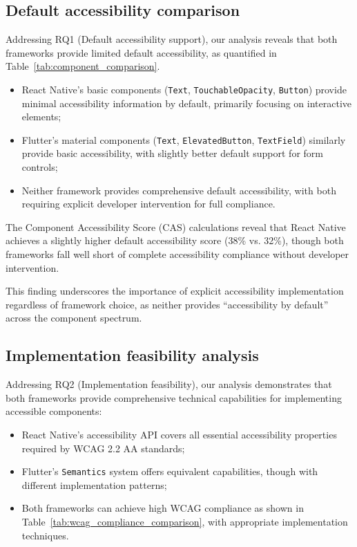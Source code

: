 \subsection{Default accessibility comparison}
\label{subsec:default-accessibility}

Addressing RQ1 (Default accessibility support), our analysis reveals that both frameworks provide limited default accessibility, as quantified in Table~\ref{tab:component_comparison}.

\begin{itemize}
    \item React Native's basic components (\texttt{Text}, \texttt{TouchableOpacity}, \texttt{Button}) provide minimal accessibility information by default, primarily focusing on interactive elements;
    
    \item Flutter's material components (\texttt{Text}, \texttt{ElevatedButton}, \texttt{TextField}) similarly provide basic accessibility, with slightly better default support for form controls;
    
    \item Neither framework provides comprehensive default accessibility, with both requiring explicit developer intervention for full compliance.
\end{itemize}

The Component Accessibility Score (CAS) calculations reveal that React Native achieves a slightly higher default accessibility score (38\% vs. 32\%), though both frameworks fall well short of complete accessibility compliance without developer intervention.

This finding underscores the importance of explicit accessibility implementation regardless of framework choice, as neither provides ``accessibility by default'' across the component spectrum.

\subsection{Implementation feasibility analysis}
\label{subsec:implementation-feasibility}

Addressing RQ2 (Implementation feasibility), our analysis demonstrates that both frameworks provide comprehensive technical capabilities for implementing accessible components:

\begin{itemize}
    \item React Native's accessibility API covers all essential accessibility properties required by WCAG 2.2 AA standards;
    
    \item Flutter's \texttt{Semantics} system offers equivalent capabilities, though with different implementation patterns;
    
    \item Both frameworks can achieve high WCAG compliance as shown in Table~\ref{tab:wcag_compliance_comparison}, with appropriate implementation techniques.
\end{itemize}

